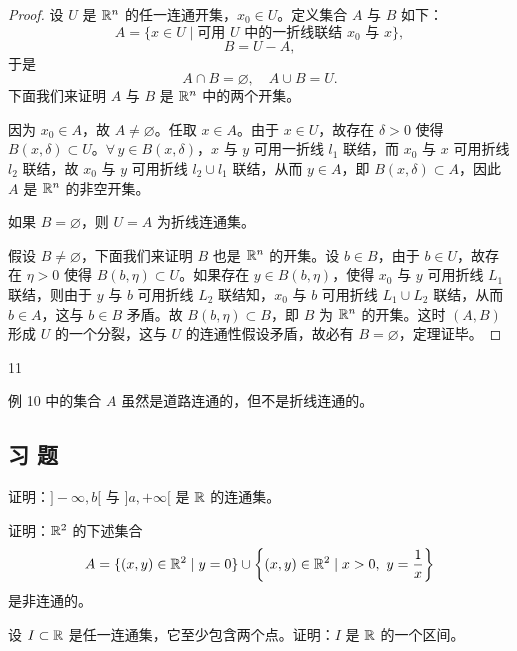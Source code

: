 \begin{proof}

设 $U$ 是 $\mathbb{R}^n$ 的任一连通开集，$x_0\in U$。定义集合 $A$ 与 $B$ 如下：
\[A=\{x\in U\mid\text{可用 }U\text{ 中的一折线联结 }x_0\text{ 与 }x\},\]
\[B=U-A,\]
于是
\[A\cap B=\varnothing,\quad A\cup B=U.\]
下面我们来证明 $A$ 与 $B$ 是 $\mathbb{R}^n$ 中的两个开集。

因为 $x_0\in A$，故 $A\neq\varnothing$。任取 $x\in A$。由于 $x\in U$，故存在 $\delta>0$ 使得 $B(x,\delta)\subset U$。$\forall\,y\in B(x,\delta)$，$x$ 与 $y$ 可用一折线 $l_1$ 联结，而 $x_0$ 与 $x$ 可用折线 $l_2$ 联结，故 $x_0$ 与 $y$ 可用折线 $l_2\cup l_1$ 联结，从而 $y\in A$，即 $B(x,\delta)\subset A$，因此 $A$ 是 $\mathbb{R}^n$ 的非空开集。

如果 $B=\varnothing$，则 $U=A$ 为折线连通集。

假设 $B\neq\varnothing$，下面我们来证明 $B$ 也是 $\mathbb{R}^n$ 的开集。设 $b\in B$，由于 $b\in U$，故存在 $\eta>0$ 使得 $B(b,\eta)\subset U$。如果存在 $y\in B(b,\eta)$，使得 $x_0$ 与 $y$ 可用折线 $L_1$ 联结，则由于 $y$ 与 $b$ 可用折线 $L_2$ 联结知，$x_0$ 与 $b$ 可用折线 $L_1\cup L_2$ 联结，从而 $b\in A$，这与 $b\in B$ 矛盾。故 $B(b,\eta)\subset B$，即 $B$ 为 $\mathbb{R}^n$ 的开集。这时 $(A,B)$ 形成 $U$ 的一个分裂，这与 $U$ 的连通性假设矛盾，故必有 $B=\varnothing$，定理证毕。

\end{proof}

\begin{sourceexample}{11}

例 10 中的集合 $A$ 虽然是道路连通的，但不是折线连通的。

\end{sourceexample}

\subsection*{习 题}

\begin{exercise}
	\item 证明：$]-\infty,b[$ 与 $]a,+\infty[$ 是 $\mathbb{R}$ 的连通集。
\end{exercise}

\begin{exercise}
	\item 证明：$\mathbb{R}^2$ 的下述集合
	\[A=\{(x,y)\in\mathbb{R}^2\mid y=0\}\cup\left\{(x,y)\in\mathbb{R}^2\mid x>0,\ y=\frac1x\right\}\]
	是非连通的。
\end{exercise}

\begin{exercise}
	\item 设 $I\subset\mathbb{R}$ 是任一连通集，它至少包含两个点。证明：$I$ 是 $\mathbb{R}$ 的一个区间。
\end{exercise}

